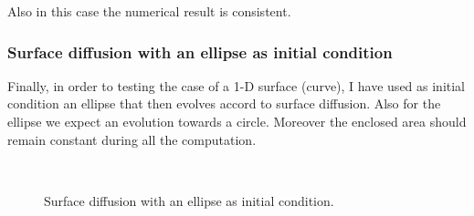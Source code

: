\documentclass[a4paper,11pt, onecolumn]{article}
\begin{document}
Also in this case the numerical result is consistent.

\subsubsection{Surface diffusion with an ellipse as initial condition}
\label{subsubsec:sd_ellipse}

Finally, in order to testing the case of a 1-D surface (curve), I have used as
initial condition an ellipse that then evolves accord to surface diffusion. Also
for the ellipse we expect an evolution towards a circle. Moreover the enclosed
area should remain constant during all the computation.

\begin{figure}[htbp]
 \centering
 \quad
 \\
 \quad
 \caption{Surface diffusion with an ellipse as initial condition.}
 \label{fig:sd_ellipse}
\end{figure}
\end{document}

